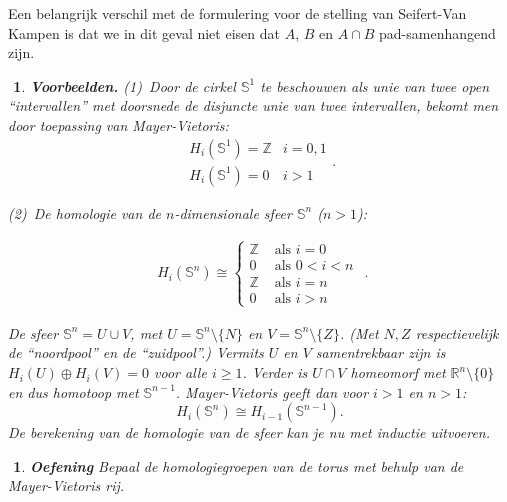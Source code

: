 \documentclass[12pt]{book}
\newcommand{\Z}{\mathbb{Z}}
\newtheorem{vbnh}[stelh]{$\!\!$}
\newenvironment{vbn}{\begin{vbnh} \em {\bf Voorbeelden.}}{\end{vbnh}}
\newtheorem{eoef}{$\!\!$}[chapter]
\newenvironment{oef}{\begin{eoef} {\bf Oefening}}{\end{eoef}}
\begin{document}
Een belangrijk verschil met de formulering voor de stelling van Seifert-Van Kampen is dat we in dit geval niet eisen dat $A$, $B$ en $A \cap B$ pad-samenhangend zijn. 


\begin{vbn}
(1)\ Door de cirkel $\mathbb{S}^1$ te beschouwen als unie van twee open ``intervallen'' met doorsnede
de disjuncte unie van twee intervallen, bekomt men door toepassing van Mayer-Vietoris:
$$\begin{array}{ll}
H_{i}(\mathbb{S}^{1})=\Z & i=0,1\\
H_{i}(\mathbb{S}^{1})=0 & i>1\end{array}.$$

(2)\ De homologie van de $n$-dimensionale sfeer $\mathbb{S}^{n}$ ($n> 1$):

$$\begin{array}{c}
H_{i}(\mathbb{S}^{n})\cong \left\{\begin{array}{ll}
\Z & \mbox{ als } i=0\\
0 & \mbox{ als } 0<i<n\\
\Z & \mbox{ als } i=n\\
0 & \mbox{ als }i>n
\end{array}\right.\end{array}.$$

De sfeer $\mathbb{S}^n=U\cup V$, met $U=\mathbb{S}^n\setminus\{N\}$ en
$V=\mathbb{S}^n\setminus\{Z\}$. (Met $N,Z$ respectievelijk de ``noordpool'' en de ``zuidpool''.)
Vermits $U$ en $V$ samentrekbaar zijn is $H_{i}(U)\oplus H_{i}(V)=0$ voor alle $i\geq 1$.
Verder is $U\cap V$ homeomorf met $\mathbb{R}^{n}\setminus
\{0\}$ en dus homotoop met $\mathbb{S}^{n-1}$. Mayer-Vietoris geeft dan voor $i>1$ en $n> 1$:
$$H_{i}(\mathbb{S}^{n})\cong H_{i-1}(\mathbb{S}^{n-1}).$$
De berekening van de homologie van de sfeer kan je nu met inductie uitvoeren.
\end{vbn}

\begin{oef}
Bepaal de homologiegroepen van de torus met behulp van de Mayer-Vietoris rij.
\end{oef}
\end{document}
